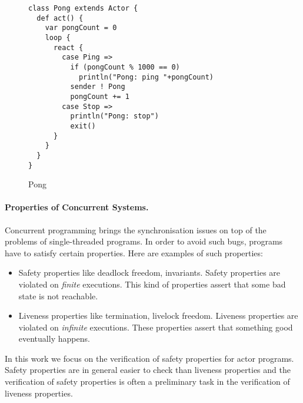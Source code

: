 \documentclass[a4paper]{report}
\numberwithin{algorithm}{chapter}
\begin{document}
\begin{example}
\begin{figure}[ht]
  \centering
\begin{subfloat}
\begin{minipage}[b]{6cm}
{\scriptsize
\begin{verbatim}
class Pong extends Actor {
  def act() {
    var pongCount = 0
    loop {
      react {
        case Ping =>
          if (pongCount % 1000 == 0)
            println("Pong: ping "+pongCount)
          sender ! Pong
          pongCount += 1
        case Stop =>
          println("Pong: stop")
          exit()
      }
    }
  }
}
\end{verbatim}
}
\end{minipage}
\end{subfloat}
  \caption{Pong}
  \label{pong}
\end{figure}

\end{example}

\paragraph{Properties of Concurrent Systems.}
Concurrent programming brings the synchronisation issues on top of the problems of single-threaded programs.
In order to avoid such bugs, programs have to satisfy certain properties.
Here are examples of such properties:

\begin{itemize}
\item Safety properties like deadlock freedom, invariants.
Safety properties are violated on \emph{finite} executions.
This kind of properties assert that some bad state is not reachable.

\item Liveness properties like termination, livelock freedom.
Liveness properties are violated on \emph{infinite} executions.
These properties assert that something good eventually happens.
\end{itemize}

In this work we focus on the verification of safety properties for actor programs.
Safety properties are in general easier to check than liveness properties and the verification of safety properties is often a preliminary task in the verification of liveness properties.
\end{document}
